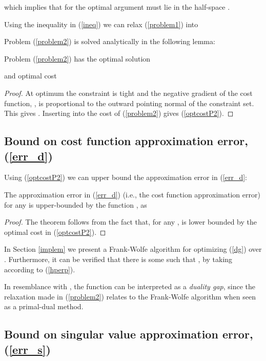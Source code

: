 \documentclass{article}
\begin{document}
which implies that for  the optimal argument  must lie in the half-space .

Using the inequality in (\ref{ineq}) we can relax (\ref{problem1}) into

Problem (\ref{problem2}) is solved analytically in the following lemma:
\begin{lemma}
Problem (\ref{problem2}) has the optimal solution

and optimal cost

\end{lemma}
\begin{proof}
At optimum the constraint is tight and the negative gradient of the cost function, , is proportional to the outward pointing normal of the constraint set. This gives . Inserting  into the cost of (\ref{problem2}) gives (\ref{optcostP2}).
\end{proof}

\subsection{Bound on cost function approximation error, (\ref{err_d})}

Using (\ref{optcostP2}) we can upper bound the approximation error in (\ref{err_d}:
\begin{theorem}
The approximation error in (\ref{err_d}) (i.e., the cost function approximation error) for any  is upper-bounded by the function , as

\end{theorem}
\begin{proof}
The theorem follows from the fact that, for any ,  is lower bounded by the optimal cost in (\ref{optcostP2}).
\end{proof}
\begin{remark} \label{rem}
In Section \ref{implem} we present a Frank-Wolfe algorithm for optimizing (\ref{dg}) over . Furthermore, it can be verified that there is some  such that , by taking  according to (\ref{hperp}).
 \end{remark}
 \begin{remark}
In resemblance with \cite{Giesen:2012}, the function  can be interpreted as a \textit{duality gap}, since the relaxation made in (\ref{problem2}) relates to the Frank-Wolfe algorithm \cite{Jaggi:2013} when seen as a primal-dual method.
\end{remark}

\subsection{Bound on singular value approximation error, (\ref{err_s})}
\end{document}
